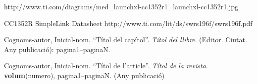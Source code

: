 \documentclass[catalan,final]{setup/eetac_tfc_pfc}
\begin{document}
\begin{thebibliography}{2}
http://www.ti.com/diagrams/med\_launchxl-cc1352r1\_launchxl-cc1352r1.jpg

CC1352R SimpleLink Datasheet
http://www.ti.com/lit/ds/swrs196f/swrs196f.pdf

Cognoms-autor, Inicial-nom.
``Títol del capítol''. {\it Títol del llibre}.
(Editor. Ciutat. Any publicació): pagina1--paginaN.

Cognoms-autor, Inicial-nom.
``Títol de l'article''. {\it Títol de la revista}.
{\bf volum}(numero),
pagina1--paginaN. (Any publicació) 



\end{thebibliography}

\pagestyle{empty}  %

\appendix\senseportada




\end{document}
